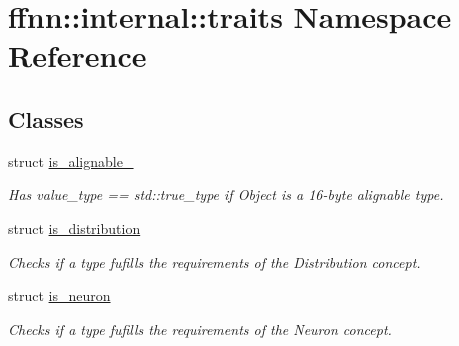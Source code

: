 \hypertarget{namespaceffnn_1_1internal_1_1traits}{\section{ffnn\-:\-:internal\-:\-:traits Namespace Reference}
\label{namespaceffnn_1_1internal_1_1traits}
}
\subsection*{Classes}
\begin{DoxyCompactItemize}
\item 
struct \hyperlink{structffnn_1_1internal_1_1traits_1_1is__alignable__128}{is\-\_\-alignable\-\_}
\begin{DoxyCompactList}\small\item\em Has {\ttfamily value\-\_\-type == std\-::true\-\_\-type} if {\ttfamily Object} is a 16-\/byte alignable type. \end{DoxyCompactList}\item 
struct \hyperlink{structffnn_1_1internal_1_1traits_1_1is__distribution}{is\-\_\-distribution}
\begin{DoxyCompactList}\small\item\em Checks if a type fufills the requirements of the Distribution concept. \end{DoxyCompactList}\item 
struct \hyperlink{structffnn_1_1internal_1_1traits_1_1is__neuron}{is\-\_\-neuron}
\begin{DoxyCompactList}\small\item\em Checks if a type fufills the requirements of the Neuron concept. \end{DoxyCompactList}\end{DoxyCompactItemize}
